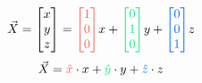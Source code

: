 \documentclass[preview]{standalone}
\begin{document}
$$\vec{X} = \begin{bmatrix}x\\y\\z\end{bmatrix} = \textcolor[HTML]{fe5e56}{\begin{bmatrix}1\\0\\0\end{bmatrix}} x + \textcolor[HTML]{00ef75}{\begin{bmatrix}0\\1\\0\end{bmatrix}} y + \textcolor[HTML]{0069fe}{\begin{bmatrix}0\\0\\1\end{bmatrix}} z$$
$$\vec{X} = \textcolor[HTML]{fe5e56}{\hat{x}}\cdot x + \textcolor[HTML]{00ef75}{\hat{y}}\cdot y + \textcolor[HTML]{0069fe}{\hat{z}}\cdot z$$
\end{document}

